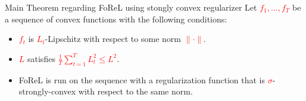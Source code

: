 \documentclass{beamer}
\newcommand{\mathred}[1]{\textcolor{mathred}{#1}}
\begin{document}
\begin{small}

\begin{frame}{Main Theorem regarding FoReL using stongly convex regularizer}
Let \textcolor{red}{$f_1, \ldots, f_T$} be a sequence of convex functions with the following conditions:

\begin{itemize}
  \item \textcolor{red}{$f_t$} is \textcolor{red}{$L_t$}-Lipschitz with respect to some norm \textcolor{red}{$\|\cdot\|$}.
  \item \textcolor{red}{$L$} satisfies \textcolor{red}{$\frac{1}{T} \sum_{t=1}^{T} L_t^2 \leq L^2$}.
  \item FoReL is run on the sequence with a regularization function that is \textcolor{red}{$\sigma$}-strongly-convex with respect to the same norm.
\end{itemize}


\end{frame}
\end{small}
\end{document}
